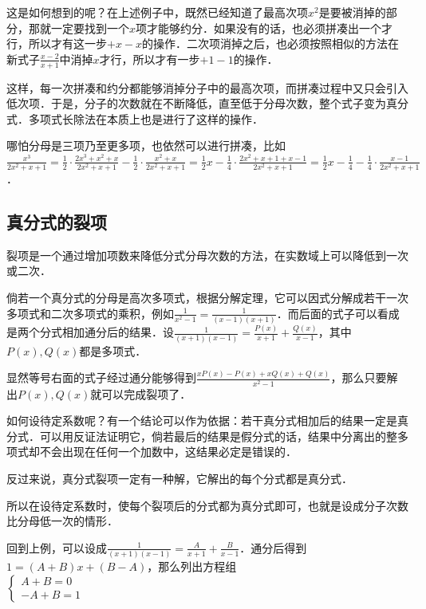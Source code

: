 \documentclass{ctexbook}
\begin{document}
这是如何想到的呢？在上述例子中，既然已经知道了最高次项$x^{2}$是要被消掉的部分，那就一定要找到一个$x$项才能够约分．如果没有的话，也必须拼凑出一个才行，所以才有这一步$+x-x$的操作．二次项消掉之后，也必须按照相似的方法在新式子$\frac{x-2}{x+1}$中消掉$x$才行，所以才有一步$+1-1$的操作．\par
这样，每一次拼凑和约分都能够消掉分子中的最高次项，而拼凑过程中又只会引入低次项．于是，分子的次数就在不断降低，直至低于分母次数，整个式子变为真分式．多项式长除法在本质上也是进行了这样的操作．\par
哪怕分母是三项乃至更多项，也依然可以进行拼凑，比如$\frac{x^{3}}{2x^{2}+x+1}=\frac{1}{2}\cdot\frac{2x^{3}+x^{2}+x}{2x^{2}+x+1}-\frac{1}{2}\cdot\frac{x^{2}+x}{2x^{2}+x+1}=\frac{1}{2}x-\frac{1}{4}\cdot\frac{2x^{2}+x+1+x-1}{2x^{2}+x+1}=\frac{1}{2}x-\frac{1}{4}-\frac{1}{4}\cdot\frac{x-1}{2x^{2}+x+1}$．
\subsection{真分式的裂项}
裂项是一个通过增加项数来降低分式分母次数的方法，在实数域上可以降低到一次或二次．\par
倘若一个真分式的分母是高次多项式，根据分解定理，它可以因式分解成若干一次多项式和二次多项式的乘积，例如$\frac{1}{x^{2}-1}=\frac{1}{\left(x-1\right)\left(x+1\right)}$．而后面的式子可以看成是两个分式相加通分后的结果．设$\frac{1}{\left(x+1\right)\left(x-1\right)}=\frac{P\left(x\right)}{x+1}+\frac{Q\left(x\right)}{x-1}$，其中$P\left(x\right),Q\left(x\right)$都是多项式．\par
显然等号右面的式子经过通分能够得到$\frac{xP\left(x\right)-P\left(x\right)+xQ\left(x\right)+Q\left(x\right)}{x^{2}-1}$，那么只要解出$P\left(x\right),Q\left(x\right)$就可以完成裂项了．\par
如何设待定系数呢？有一个结论可以作为依据：若干真分式相加后的结果一定是真分式．可以用反证法证明它，倘若最后的结果是假分式的话，结果中分离出的整多项式却不会出现在任何一个加数中，这结果必定是错误的．\par
反过来说，真分式裂项一定有一种解，它解出的每个分式都是真分式．\par
所以在设待定系数时，使每个裂项后的分式都为真分式即可，也就是设成分子次数比分母低一次的情形．\par
回到上例，可以设成$\frac{1}{\left(x+1\right)\left(x-1\right)}=\frac{A}{x+1}+\frac{B}{x-1}$．通分后得到$1=\left(A+B\right)x+\left(B-A\right)$，那么列出方程组\\
$\begin{cases}A+B=0\\-A+B=1\end{cases}$\\
\end{document}
